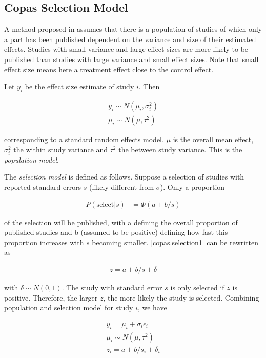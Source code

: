 \documentclass[11pt,a4paper,twoside]{book}\usepackage[]{graphicx}\usepackage[]{color}
\begin{document}
\subsection{Copas Selection Model}

A method proposed in \cite{Copas1,Copas2,Copas3} assumes that there is a population of studies of which only a part has been published dependent on the variance and size of their estimated effects. Studies with small variance and large effect sizes are more likely to be published than studies with large variance and small effect sizes. Note that small effect size means here a treatment effect close to the control effect.

Let $y_i$ be the effect size estimate of study $i$. Then 

\begin{align}
y_{i} \sim N(\mu_{i}, \sigma_{i}^2) \\
\mu_{i} \sim N(\mu, \tau^2)
\end{align}

corresponding to a standard random effects model. $\mu$ is the overall mean effect, $\sigma_{i}^2$ the within study variance and $\tau^2$ the between study variance. This is the \textit{population model}.

\vspace{0mm}
The \textit{selection model} is defined as follows. Suppose a selection of studies with reported standard errors $s$ (likely different from $\sigma$). Only a proportion 

\begin{align}
P(\textrm{select}|s) &= \Phi(a + b/s) \label{copas.selection1}
\end{align}

of the selection will be published, with a defining the overall proportion of published studies and b (assumed to be positive) defining how fast this proportion increases with $s$ becoming smaller. \ref{copas.selection1} can be rewritten as 

\begin{align}
z = a + b/s + \delta \label{copas.selection2}
\end{align}

with $\delta \sim N(0,1)$. The study with standard error $s$ is only selected if $z$ is positive. Therefore, the larger $z$, the more likely the study is selected.
Combining population and selection model for study $i$, we have 

\begin{align}
y_{i} = \mu_{i} + \sigma_{i}\epsilon_{i} \\
\mu_{i} \sim N(\mu, \tau^2) \\
z_{i} = a + b/s_{i} + \delta_{i}
\end{align}
\end{document}
